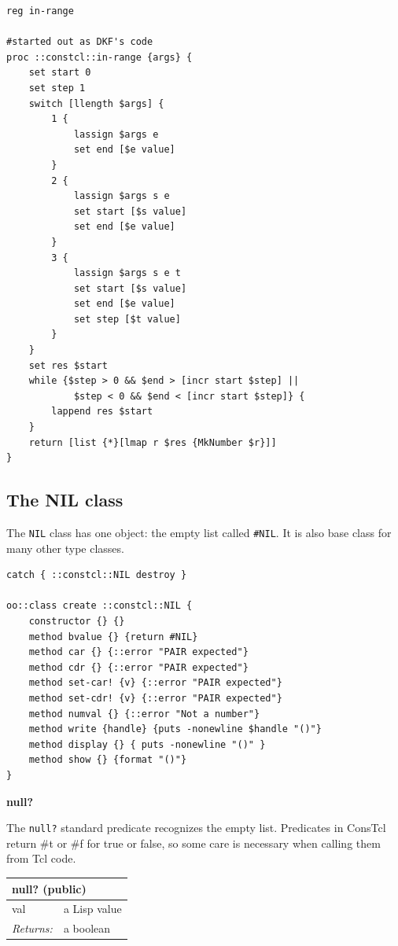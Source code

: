 \documentclass[twoside,9pt]{report}
\begin{document}
\noindent\makebox[\linewidth]{\rule{\linewidth}{0.4pt}}
\begin{lstlisting}
reg in-range
 
#started out as DKF's code
proc ::constcl::in-range {args} {
    set start 0
    set step 1
    switch [llength $args] {
        1 {
            lassign $args e
            set end [$e value]
        }
        2 {
            lassign $args s e
            set start [$s value]
            set end [$e value]
        }
        3 {
            lassign $args s e t
            set start [$s value]
            set end [$e value]
            set step [$t value]
        }
    }
    set res $start
    while {$step > 0 && $end > [incr start $step] ||
            $step < 0 && $end < [incr start $step]} {
        lappend res $start
    }
    return [list {*}[lmap r $res {MkNumber $r}]]
}
\end{lstlisting}
\noindent\makebox[\linewidth]{\rule{\linewidth}{0.4pt}}
\subsection{The NIL class}
\label{the-nil-class}

The \texttt{NIL} class has one object: the empty list called \texttt{\#NIL}. It is also base class for many other type classes.

\noindent\makebox[\linewidth]{\rule{\linewidth}{0.4pt}}
\begin{lstlisting}
catch { ::constcl::NIL destroy }
 
oo::class create ::constcl::NIL {
    constructor {} {}
    method bvalue {} {return #NIL}
    method car {} {::error "PAIR expected"}
    method cdr {} {::error "PAIR expected"}
    method set-car! {v} {::error "PAIR expected"}
    method set-cdr! {v} {::error "PAIR expected"}
    method numval {} {::error "Not a number"}
    method write {handle} {puts -nonewline $handle "()"}
    method display {} { puts -nonewline "()" }
    method show {} {format "()"}
}
\end{lstlisting}
\noindent\makebox[\linewidth]{\rule{\linewidth}{0.4pt}}

\textbf{null?}


The \texttt{null?} standard predicate recognizes the empty list. Predicates in ConsTcl return \#t or \#f for true or false, so some care is necessary when calling them from Tcl code.

\begin{tabular}{ |l l| }
\hline
\multicolumn{2}{|l|}{null? (public)} \\
\hline
val & a Lisp value \\
\textit{Returns:} & a boolean \\
\hline
\end{tabular}
\end{document}
